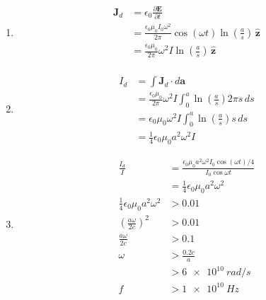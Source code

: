 \documentclass{article}
\renewcommand{\vec}[1]{\boldsymbol{\mathbf{#1}}}
\newcommand{\uvec}[1]{\hat{\vec{#1}}}
\begin{document}
\begin{enumerate}
  \item

        \begin{align*}
          \vec{J}_d & = \epsilon_0 \frac{\partial \vec{E}}{\partial t}                                                        \\
                    & = \frac{\epsilon_0 \mu_0 I_0 \omega^2}{2 \pi} \cos (\omega t) \ln \left( \frac{a}{s} \right) \,\uvec{z} \\
                    & = \frac{\epsilon_0 \mu_0}{2 \pi} \omega^2 I \ln \left( \frac{a}{s} \right) \,\uvec{z}                   \\
        \end{align*}

  \item

        \begin{align*}
          I_d & = \int \vec{J}_d \cdot d \vec{a}                                                                  \\
              & = \frac{\epsilon_0 \mu_0}{2 \pi} \omega^2 I \int_0^a \ln \left( \frac{a}{s} \right) 2 \pi s \,d s \\
              & = \epsilon_0 \mu_0 \omega^2 I \int_0^a \ln \left( \frac{a}{s} \right) s \,d s                     \\
              & = \frac{1}{4} \epsilon_0 \mu_0 a^2 \omega^2 I
        \end{align*}

  \item

        \begin{align*}
          \frac{I_d}{I}                             & = \frac{\epsilon_0 \mu_0 a^2 \omega^2 I_0 \cos (\omega t) / 4}{I_0 \cos \omega t} \\
                                                    & = \frac{1}{4} \epsilon_0 \mu_0 a^2 \omega^2                                       \\
          \frac{1}{4} \epsilon_0 \mu_0 a^2 \omega^2 & > 0.01                                                                            \\
          \left( \frac{a \omega}{2 c} \right)^2     & > 0.01                                                                            \\
          \frac{a \omega}{2 c}                      & > 0.1                                                                             \\
          \omega                                    & > \frac{0.2 c}{a}                                                                 \\
                                                    & > \qty{6e10}{rad/s}                                                               \\
          f                                         & > \qty{1e10}{Hz}
        \end{align*}
\end{enumerate}
\end{document}
